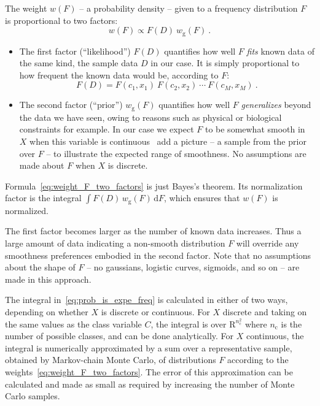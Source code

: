 \documentclass[\ifafour a4paper,12pt,\else a5paper,10pt,\fi%
onecolumn,oneside,article,%
british%
]{memoir}
\theoremstyle{remark}
\theoremstyle{innote}
\newcommand*{\di}{\mathrm{d}}%
\newcommand*{\RR}{\bm{\mathrm{R}}}
\renewcommand*{\|}[1][]{\nonscript\:#1\vert\nonscript\:\mathopen{}}
\newcommand*{\wrench}{{\fontencoding{U}\fontfamily{fontawesomethree}\selectfont\symbol{114}}}
\newcommand{\mynote}[1]{ {\color{notecolour}#1}}
\newcommand*{\nc}{n_{\textrm{c}}}
\newcommand*{\wf}{w}
\newcommand*{\wfo}{w_{\textrm{g}}}
\begin{document}
The weight $\wf(F)$ -- a probability density -- given to a frequency distribution $F$ is proportional to two factors:
\begin{equation}
  \label{eq:weight_F_two_factors}
  \wf(F) \propto F(D)\ \wfo(F) \ .
\end{equation}
\begin{itemize}
  
\item The first factor (\enquote{likelihood}) $F(D)$ quantifies how well $F$ \emph{fits} known data of the same kind, the sample data $D$ in our case. It is simply proportional to how frequent the known data would be, according to $F$:
  \begin{equation}
    \label{eq:factor_likelihood}
F(D) = F(c_{1}, x_{1})\ F(c_{2}, x_{2})\ \dotsm\ F(c_{M}, x_{M}) \ .
  \end{equation}

\item The second factor (\enquote{prior}) $\wfo(F)$ quantifies how well $F$ \emph{generalizes} beyond the data we have seen, owing to reasons such as physical or biological constraints for example. In our case we expect $F$ to be somewhat smooth in $X$ when this variable is continuous \autocites[Cf.][]{goodetal1971} \mynote{\wrench\ add a picture -- a sample from the prior over $F$ -- to illustrate the expected range of smoothness}. No assumptions are made about $F$ when $X$ is discrete. 
\end{itemize}
Formula~\eqref{eq:weight_F_two_factors} is just Bayes's theorem. Its normalization factor is the integral $\int F(D)\, \wfo(F)\, \di F$, which ensures that $\wf(F)$ is normalized.

The first factor becomes larger as the number of known data increases. Thus a large amount of data indicating a non-smooth distribution $F$ will override any smoothness preferences embodied in the second factor. Note that no assumptions about the shape of $F$ -- no gaussians, logistic curves, sigmoids, and so on -- are made in this approach.

The integral in~\eqref{eq:prob_is_expe_freq} is calculated in either of two ways, depending on whether $X$ is discrete or continuous. For $X$ discrete and taking on the same values as the class variable $C$, the integral is over $\RR^{\nc^{2}}$ where $\nc$ is the number of possible classes, and can be done analytically. For $X$ continuous, the integral is numerically approximated by a sum over a representative sample, obtained by Markov-chain Monte Carlo, of distributions $F$ according to the weights~\eqref{eq:weight_F_two_factors}. The error of this approximation can be calculated and made as small as required by increasing the number of Monte Carlo samples.
\end{document}
